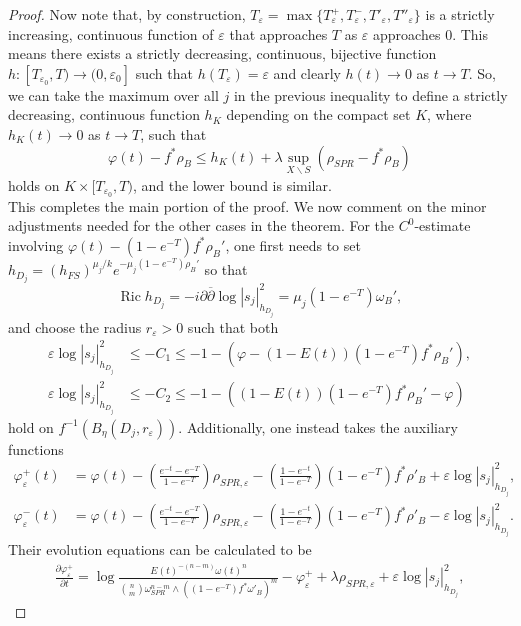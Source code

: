\documentclass[12pt]{article}
\numberwithin{equation}{section}
\renewcommand{\d}{\partial}
\newcommand{\dbar}{\overline{\partial}}
\newcommand{\e}{\varepsilon}
\DeclareMathOperator{\Ric}{Ric}
\begin{document}
\begin{proof}
Now note that, by construction, $T_\e = \max\{T^+_{\e},T^-_{\e},T'_{\e},T''_{\e}\}$ is a strictly increasing, continuous function of $\e$ that approaches $T$ as $\e$ approaches $0$. This means there exists a strictly decreasing, continuous, bijective function $h: [T_{\e_0}, T) \to (0,\e_0]$ such that $h(T_{\e}) = \e$ and clearly $h(t) \to 0$ as $t \to T$. So, we can take the maximum over all $j$ in the previous inequality to define a strictly decreasing, continuous function $h_K$ depending on the compact set $K$, where $h_K(t) \to 0$ as $t \to T$, such that 
\begin{equation*}
    \varphi(t) - f^*\rho_B \leq h_K(t) + \lambda \sup_{X \backslash S} (\rho_{SPR}-f^*\rho_B)
\end{equation*}
holds on $K \times [T_{\e_0},T)$, and the lower bound is similar.\\
This completes the main portion of the proof. We now comment on the minor adjustments needed for the other cases in the theorem. For the $C^0$-estimate involving $\varphi(t)-(1-e^{-T})f^*\rho_B'$, one first needs to set $h_{D_j} = (h_{FS})^{\mu_j/k} e^{-\mu_j(1-e^{-T})\rho_B'}$ so that
\begin{equation*}
    \Ric h_{D_j} = -i\d\dbar \log |s_j|^2_{h_{D_j}} = \mu_j(1-e^{-T})\omega_B',
\end{equation*}
and choose the radius $r_\e > 0$ such that both
\begin{align*}
    \e \log |s_j|_{h_{D_j}}^2 &\leq -C_1 \leq -1 - (\varphi - (1-E(t)) (1-e^{-T}) f^*\rho_B'),\\
    \e \log |s_j|_{h_{D_j}}^2 &\leq -C_2 \leq -1 - ((1-E(t)) (1-e^{-T}) f^*\rho_B' - \varphi)
\end{align*}
hold on $f^{-1}(B_{\eta}(D_j,r_\e))$. Additionally, one instead takes the auxiliary functions
\begin{align*}
    \varphi_{\e}^{+}(t) &= \varphi(t) - \left(\frac{e^{-t}-e^{-T}}{1-e^{-T}}\right) \rho_{SPR,\e} - \left(\frac{1-e^{-t}}{1-e^{-T}}\right) (1-e^{-T})f^*\rho'_{B} + \e \log|s_j|_{h_{D_j}}^2,\\
    \varphi_{\e}^{-}(t) &= \varphi(t) - \left(\frac{e^{-t}-e^{-T}}{1-e^{-T}}\right) \rho_{SPR,\e} - \left(\frac{1-e^{-t}}{1-e^{-T}}\right) (1-e^{-T})f^*\rho'_{B} - \e \log|s_j|_{h_{D_j}}^2.
\end{align*}
Their evolution equations can be calculated to be
\begin{align*}
    \frac{\d \varphi_{\e}^+}{\d t} = \log \frac{E(t)^{-(n-m)} \omega(t)^n}{{n \choose m} \omega_{SPR}^{n-m} \wedge ((1-e^{-T})f^* \omega'_B)^m} - \varphi_{\e}^{+} + \lambda \rho_{SPR,\e} + \e \log |s_j|^2_{h_{D_j}},

\end{align*}
\end{proof}
\end{document}
